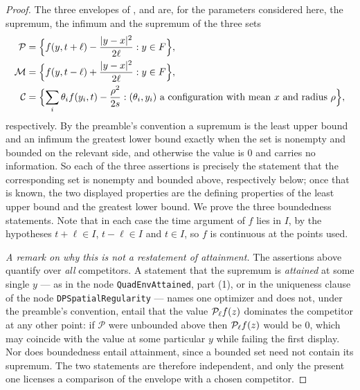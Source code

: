 \begin{proof}
The three envelopes of ,  and
 are, for the parameters considered here, the supremum, the
infimum and the supremum of the three sets
\begin{align*}
  \mathcal P&=\Bigl\{f(y,t+\ell)-\frac{|y-x|^2}{2\ell}:y\in F\Bigr\},\\
  \mathcal M&=\Bigl\{f(y,t-\ell)+\frac{|y-x|^2}{2\ell}:y\in F\Bigr\},\\
  \mathcal C&=\Bigl\{\sum_i\theta_if(y_i,t)-\frac{\rho^2}{2s}:
      (\theta_i,y_i)\ \text{a configuration with mean }x
      \text{ and radius }\rho\Bigr\},
\end{align*}
respectively. By the preamble's convention a supremum is the least upper bound
and an infimum the greatest lower bound exactly when the set is nonempty and
bounded on the relevant side, and otherwise the value is $0$ and carries no
information. So each of the three assertions is precisely the statement that the
corresponding set is nonempty and bounded above, respectively below; once that
is known, the two displayed properties are the defining properties of the least
upper bound and the greatest lower bound. We prove the three boundedness
statements. Note that in each case the time argument of $f$ lies in $I$, by the
hypotheses $t+\ell\in I$, $t-\ell\in I$ and $t\in I$, so $f$ is continuous at
the points used.

\emph{A remark on why this is not a restatement of attainment.} The assertions
above quantify over \emph{all} competitors. A statement that the supremum is
\emph{attained} at some single $y$ --- as in the node
\texttt{QuadEnvAttained}, part (1), or in the uniqueness clause of the node
\texttt{DPSpatialRegularity} --- names one
optimizer and does not, under the preamble's convention, entail that the value
$\mathcal{P}_\ell f(z)$ dominates the competitor at any other point: if $\mathcal P$
were unbounded above then $\mathcal{P}_\ell f(z)$ would be $0$, which may coincide
with the value at some particular $y$ while failing the first display. Nor does
boundedness entail attainment, since a bounded set need not contain its
supremum. The two statements are therefore independent, and only the present
one licenses a comparison of the envelope with a chosen competitor.


\end{proof}
